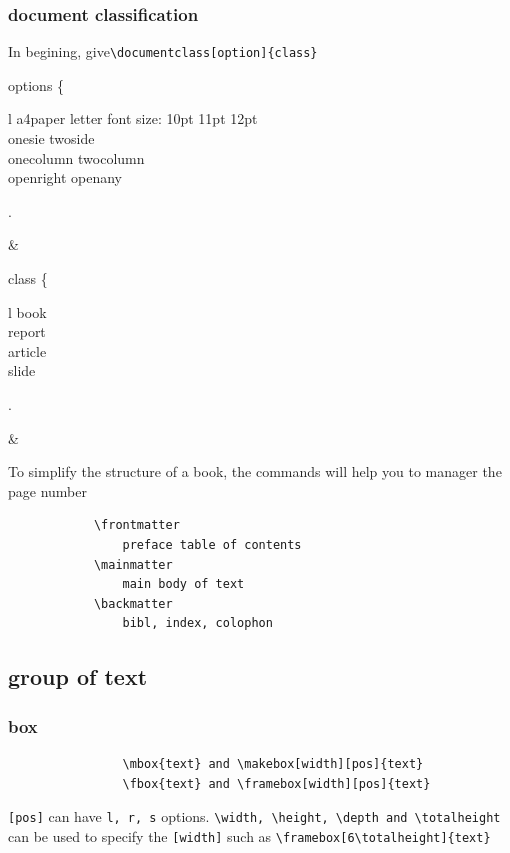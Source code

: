 \documentclass[a4paper,12pt,twoside]{book}
\begin{document}
\begin{CJK*}{UTF8}{song}
		\subsubsection{document classification}
			In begining, give\verb=\documentclass[option]{class}= \par
			\begin{flalign*}
			\begin{split}
			\textrm{options} \left\{ \begin{array}{l}
			\textrm{a4paper letter}
			\textrm{font size: 10pt 11pt 12pt } \\
			\textrm{onesie twoside} \\
			\textrm{onecolumn twocolumn}\\
			\textrm{openright openany}\\
			\end{array} \right.
			\end{split}&
			\end{flalign*}

			\begin{flalign*}
			\begin{split}
			\textrm{class} \left\{ \begin{array}{l}
				\textrm{book} \\ \textrm{report} \\ \textrm{article} \\ \textrm{slide}
				\end{array} \right.
			\end{split}&
			\end{flalign*}

			To simplify the structure of a book, the commands will help you to manager the page number
			\begin{verbatim}
			\frontmatter
				preface table of contents
			\mainmatter
				main body of text
			\backmatter
				bibl, index, colophon
			\end{verbatim}	

			
	\subsection{group of text}
		\subsubsection{box}
			\begin{verbatim}
				\mbox{text} and \makebox[width][pos]{text}
				\fbox{text} and \framebox[width][pos]{text}
			\end{verbatim}	
			\verb=[pos]= can have \verb=l, r, s= options. \verb=\width, \height, \depth and \totalheight= can be used to specify the \verb=[width]= such as \verb=\framebox[6\totalheight]{text}= \par


\end{CJK*}
\end{document}
